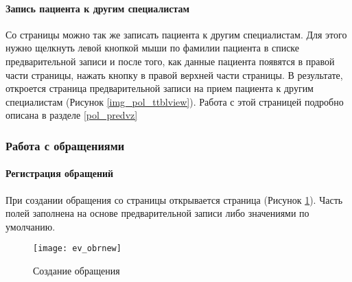 {\paragraph{Запись пациента к другим специалистам}

Со страницы  можно так же записать пациента к другим специалистам. Для этого нужно щелкнуть левой кнопкой мыши по фамилии пациента в списке предварительной записи и после того, как данные пациента появятся в правой части страницы, нажать кнопку  в правой верхней части страницы. В результате, откроется страница предварительной записи на прием пациента к другим специалистам (Рисунок \ref{img_pol_ttblview}). Работа с этой страницей подробно описана в разделе \ref{pol_predvz}

\subsubsection{Работа с обращениями}
\paragraph{Регистрация обращений}

При создании обращения со страницы  открывается страница  (Рисунок \ref{img_ev_obrnew}). Часть полей заполнена на основе  предварительной записи либо значениями по умолчанию. 

\begin{figure}[ht]\centering
	\texttt{[image: ev\_obrnew]}
	\caption{Создание обращения}
	\label{img_ev_obrnew}
\end{figure}

}
